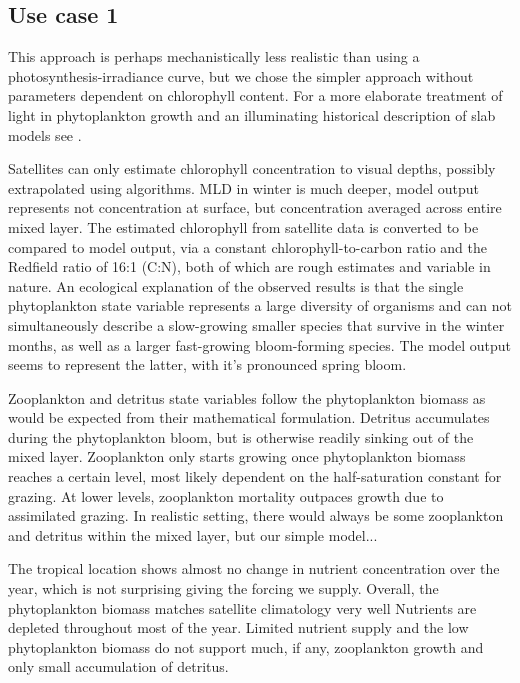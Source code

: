 \documentclass[journal abbreviations, manuscript]{copernicus}
\begin{document}
\subsection{Use case 1}

This approach is perhaps mechanistically less realistic than using a photosynthesis-irradiance curve, but we chose the simpler approach without parameters dependent on chlorophyll content. For a more elaborate treatment of light in phytoplankton growth and an illuminating historical description of slab models see \citet{Anderson2015c}.


Satellites can only estimate chlorophyll concentration to visual depths, possibly extrapolated using algorithms. MLD in winter is much deeper, model output represents not concentration at surface, but concentration averaged across entire mixed layer.
The estimated chlorophyll from satellite data is converted to be compared to model output, via a constant chlorophyll-to-carbon ratio and the Redfield ratio of 16:1 (C:N), both of which are rough estimates and variable in nature. 
An ecological explanation of the observed results is that the single phytoplankton state variable represents a large diversity of organisms and can not simultaneously describe a slow-growing smaller species that survive in the winter months, as well as a larger fast-growing bloom-forming species. The model output seems to represent the latter, with it's pronounced spring bloom. 

Zooplankton and detritus state variables follow the phytoplankton biomass as would be expected from their mathematical formulation. Detritus accumulates during the phytoplankton bloom, but is otherwise readily sinking out of the mixed layer. Zooplankton only starts growing once phytoplankton biomass reaches a certain level, most likely dependent on the half-saturation constant for grazing. At lower levels, zooplankton mortality outpaces growth due to assimilated grazing. 
In realistic setting, there would always be some zooplankton and detritus within the mixed layer, but our simple model...

The tropical location shows almost no change in nutrient concentration over the year, which is not surprising giving the forcing we supply. 
Overall, the phytoplankton biomass matches satellite climatology very well 
Nutrients are depleted throughout most of the year.
Limited nutrient supply and the low phytoplankton biomass do not support much, if any, zooplankton growth and only small accumulation of detritus.
\end{document}
